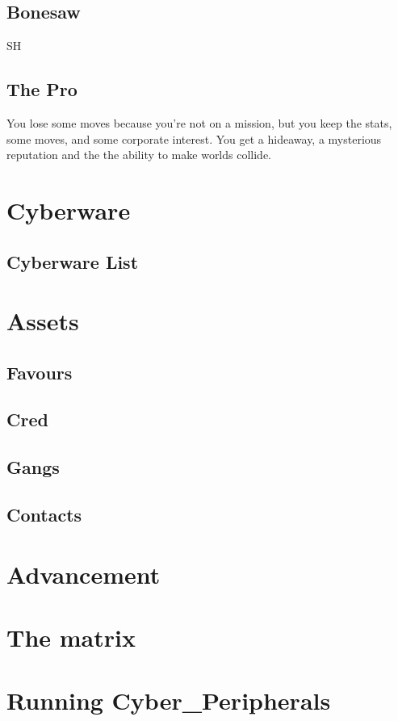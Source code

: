 \documentclass{tufte-book}
\begin{document}
\section{Bonesaw} \label{sec:Bonesaw}
SH


\section{The Pro} \label{sec:The Pro}
You lose some moves because you're not on a mission, but you keep the stats, some moves, and some corporate interest. You get a hideaway, a mysterious reputation and the the ability to make worlds collide.


\chapter{Cyberware} \label{ch:cyberware}
\section{Cyberware List} \label{sec: Cyberware list}

\chapter{Assets} 	\label{ch:assets}
\section {Favours}	\label{sec:favours}
\section {Cred} 	\label{sec:cred}
\section {Gangs}	\label{sec: gangs}
\section {Contacts}	\label{sec: contacts}

\chapter{Advancement}	\label{ch: advancement}
\chapter{The matrix}	\label{ch: the matrix}
\chapter{Running Cyber\_Peripherals}	\label{ch:running the game}
\end{document}
